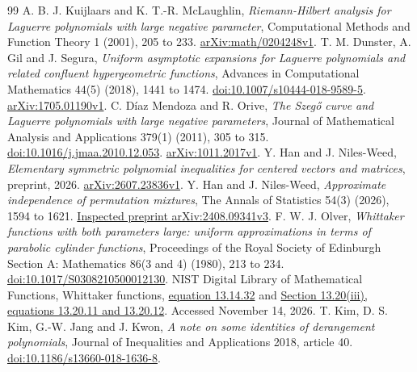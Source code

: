 \documentclass[11pt]{article}
\theoremstyle{definition}
\theoremstyle{remark}
\newcommand{\1}{\mathbf 1}
\begin{document}
\begin{thebibliography}{99}
A. B. J. Kuijlaars and K. T.-R. McLaughlin, \emph{Riemann-Hilbert analysis for Laguerre polynomials with large negative parameter}, Computational Methods and Function Theory 1 (2001), 205 to 233.
\href{https://arxiv.org/abs/math/0204248v1}{arXiv:math/0204248v1}.
T. M. Dunster, A. Gil and J. Segura, \emph{Uniform asymptotic expansions for Laguerre polynomials and related confluent hypergeometric functions}, Advances in Computational Mathematics 44(5) (2018), 1441 to 1474.
\href{https://doi.org/10.1007/s10444-018-9589-5}{doi:10.1007/s10444-018-9589-5}.
\href{https://arxiv.org/abs/1705.01190v1}{arXiv:1705.01190v1}.
C. D\'iaz Mendoza and R. Orive, \emph{The Szeg\H{o} curve and Laguerre polynomials with large negative parameters}, Journal of Mathematical Analysis and Applications 379(1) (2011), 305 to 315.
\href{https://doi.org/10.1016/j.jmaa.2010.12.053}{doi:10.1016/j.jmaa.2010.12.053}.
\href{https://arxiv.org/abs/1011.2017v1}{arXiv:1011.2017v1}.
Y. Han and J. Niles-Weed, \emph{Elementary symmetric polynomial inequalities for centered vectors and matrices}, preprint, 2026.
\href{https://arxiv.org/abs/2607.23836v1}{arXiv:2607.23836v1}.
Y. Han and J. Niles-Weed, \emph{Approximate independence of permutation mixtures}, The Annals of Statistics 54(3) (2026), 1594 to 1621.
\href{https://arxiv.org/abs/2408.09341v3}{Inspected preprint arXiv:2408.09341v3}.
F. W. J. Olver, \emph{Whittaker functions with both parameters large: uniform approximations in terms of parabolic cylinder functions}, Proceedings of the Royal Society of Edinburgh Section A: Mathematics 86(3 and 4) (1980), 213 to 234.
\href{https://doi.org/10.1017/S0308210500012130}{doi:10.1017/S0308210500012130}.
NIST Digital Library of Mathematical Functions, Whittaker functions,
\href{https://dlmf.nist.gov/13.14.E32}{equation 13.14.32} and
\href{https://dlmf.nist.gov/13.20.iii}{Section 13.20(iii), equations 13.20.11 and 13.20.12}.
Accessed November 14, 2026.
T. Kim, D. S. Kim, G.-W. Jang and J. Kwon, \emph{A note on some identities of derangement polynomials}, Journal of Inequalities and Applications 2018, article 40.
\href{https://doi.org/10.1186/s13660-018-1636-8}{doi:10.1186/s13660-018-1636-8}.
\end{thebibliography}
\end{document}
